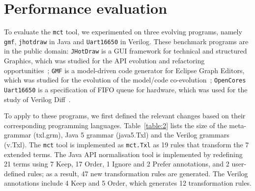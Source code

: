 \documentclass[10pt, conference, compsocconf]{IEEEtran}
\begin{document}
{\section{Performance evaluation}\label{sec:experiment}
To evaluate the {\tt mct} tool, we experimented on three evolving programs, namely {\tt gmf}, {\tt jhotdraw} in Java and {\tt Uart16650} in Verilog. These benchmark programs are in the public domain: {\tt JHotDraw} is a  GUI framework for technical and structured Graphics, which was studied for the API evolution and refactoring opportunities~\cite{DBLP:journals/smr/DigJ06}; {\tt GMF} is a model-driven code generator for Eclipse Graph Editors, which was  studied for the evolution of the model/code co-evolution~\cite{DBLP:conf/sle/HerrmannsdoerferRW09}; {\tt OpenCores Uart16650} is a specification of FIFO queue for hardware, which was used for the study of Verilog Diff~\cite{Duley:2010:PDA:1858996.1859093}.

To apply to these programs, we first defined the relevant changes based on their corresponding programming languages. Table~\ref{table:2} lists the size of the meta-grammar (txl.grm), Java 5 grammar (java5.Txl) and the Verilog grammars (v.Txl). The {\tt mct} tool is implemented as {\tt mct.Txl} as 19 rules that transform the 7 extended terms. The Java API normalisation tool is implemented by redefining 21 terms using 7 Keep, 17 Order, 1 Ignore and 2 Prefer annotations, and 2 user-defined rules; as a result, 47 new transformation rules are generated. The Verilog annotations include 4 Keep and 5 Order, which generates 12 transformation rules. 

}
\end{document}
